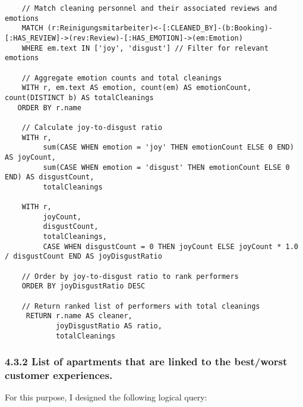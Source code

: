\documentclass[
]{article}
\begin{document}
\begin{verbatim}
    // Match cleaning personnel and their associated reviews and emotions
    MATCH (r:Reinigungsmitarbeiter)<-[:CLEANED_BY]-(b:Booking)-[:HAS_REVIEW]->(rev:Review)-[:HAS_EMOTION]->(em:Emotion)
    WHERE em.text IN ['joy', 'disgust'] // Filter for relevant emotions

    // Aggregate emotion counts and total cleanings
    WITH r, em.text AS emotion, count(em) AS emotionCount, count(DISTINCT b) AS totalCleanings
   ORDER BY r.name

    // Calculate joy-to-disgust ratio
    WITH r, 
         sum(CASE WHEN emotion = 'joy' THEN emotionCount ELSE 0 END) AS joyCount,
         sum(CASE WHEN emotion = 'disgust' THEN emotionCount ELSE 0 END) AS disgustCount,
         totalCleanings

    WITH r, 
         joyCount, 
         disgustCount, 
         totalCleanings,
         CASE WHEN disgustCount = 0 THEN joyCount ELSE joyCount * 1.0 / disgustCount END AS joyDisgustRatio

    // Order by joy-to-disgust ratio to rank performers
    ORDER BY joyDisgustRatio DESC

    // Return ranked list of performers with total cleanings
     RETURN r.name AS cleaner, 
            joyDisgustRatio AS ratio, 
            totalCleanings
\end{verbatim}

\subsubsection{4.3.2 List of apartments that are linked to the
best/worst customer
experiences.}\label{list-of-apartments-that-are-linked-to-the-bestworst-customer-experiences.}

For this purpose, I designed the following logical query:
\end{document}
